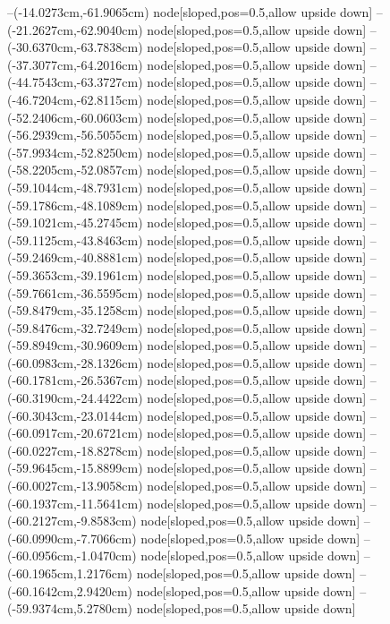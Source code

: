 --(-14.0273cm,-61.9065cm) node[sloped,pos=0.5,allow upside down]{\ArrowIn}
--(-21.2627cm,-62.9040cm) node[sloped,pos=0.5,allow upside down]{\ArrowIn}
--(-30.6370cm,-63.7838cm) node[sloped,pos=0.5,allow upside down]{\ArrowIn}
--(-37.3077cm,-64.2016cm) node[sloped,pos=0.5,allow upside down]{\ArrowIn}
--(-44.7543cm,-63.3727cm) node[sloped,pos=0.5,allow upside down]{\ArrowIn}
--(-46.7204cm,-62.8115cm) node[sloped,pos=0.5,allow upside down]{\ArrowIn}
--(-52.2406cm,-60.0603cm) node[sloped,pos=0.5,allow upside down]{\ArrowIn}
--(-56.2939cm,-56.5055cm) node[sloped,pos=0.5,allow upside down]{\ArrowIn}
--(-57.9934cm,-52.8250cm) node[sloped,pos=0.5,allow upside down]{\ArrowIn}
--(-58.2205cm,-52.0857cm) node[sloped,pos=0.5,allow upside down]{\arrowIn}
--(-59.1044cm,-48.7931cm) node[sloped,pos=0.5,allow upside down]{\ArrowIn}
--(-59.1786cm,-48.1089cm) node[sloped,pos=0.5,allow upside down]{\arrowIn}
--(-59.1021cm,-45.2745cm) node[sloped,pos=0.5,allow upside down]{\ArrowIn}
--(-59.1125cm,-43.8463cm) node[sloped,pos=0.5,allow upside down]{\ArrowIn}
--(-59.2469cm,-40.8881cm) node[sloped,pos=0.5,allow upside down]{\ArrowIn}
--(-59.3653cm,-39.1961cm) node[sloped,pos=0.5,allow upside down]{\ArrowIn}
--(-59.7661cm,-36.5595cm) node[sloped,pos=0.5,allow upside down]{\ArrowIn}
--(-59.8479cm,-35.1258cm) node[sloped,pos=0.5,allow upside down]{\ArrowIn}
--(-59.8476cm,-32.7249cm) node[sloped,pos=0.5,allow upside down]{\ArrowIn}
--(-59.8949cm,-30.9609cm) node[sloped,pos=0.5,allow upside down]{\ArrowIn}
--(-60.0983cm,-28.1326cm) node[sloped,pos=0.5,allow upside down]{\ArrowIn}
--(-60.1781cm,-26.5367cm) node[sloped,pos=0.5,allow upside down]{\ArrowIn}
--(-60.3190cm,-24.4422cm) node[sloped,pos=0.5,allow upside down]{\ArrowIn}
--(-60.3043cm,-23.0144cm) node[sloped,pos=0.5,allow upside down]{\ArrowIn}
--(-60.0917cm,-20.6721cm) node[sloped,pos=0.5,allow upside down]{\ArrowIn}
--(-60.0227cm,-18.8278cm) node[sloped,pos=0.5,allow upside down]{\ArrowIn}
--(-59.9645cm,-15.8899cm) node[sloped,pos=0.5,allow upside down]{\ArrowIn}
--(-60.0027cm,-13.9058cm) node[sloped,pos=0.5,allow upside down]{\ArrowIn}
--(-60.1937cm,-11.5641cm) node[sloped,pos=0.5,allow upside down]{\ArrowIn}
--(-60.2127cm,-9.8583cm) node[sloped,pos=0.5,allow upside down]{\ArrowIn}
--(-60.0990cm,-7.7066cm) node[sloped,pos=0.5,allow upside down]{\ArrowIn}
--(-60.0956cm,-1.0470cm) node[sloped,pos=0.5,allow upside down]{\ArrowIn}
--(-60.1965cm,1.2176cm) node[sloped,pos=0.5,allow upside down]{\ArrowIn}
--(-60.1642cm,2.9420cm) node[sloped,pos=0.5,allow upside down]{\ArrowIn}
--(-59.9374cm,5.2780cm) node[sloped,pos=0.5,allow upside down]{\ArrowIn}
